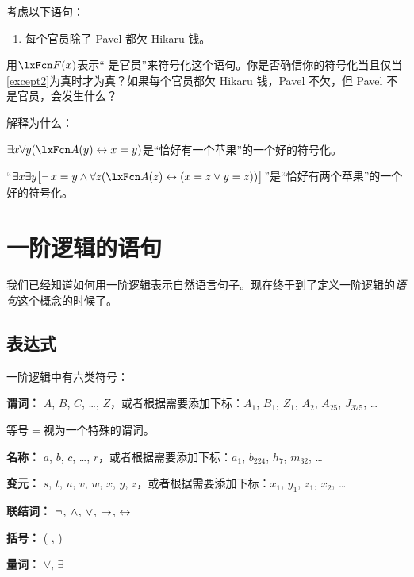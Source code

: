 \problempart
考虑以下语句：


\begin{enumerate}
	\item\label{except2} 每个官员除了 Pavel 都欠 Hikaru 钱。
\end{enumerate}


用$\atom{F}{x}$表示“ 是官员”来符号化这个语句。你是否确信你的符号化当且仅当\cref*{except2}为真时才为真？如果每个官员都欠 Hikaru 钱，Pavel 不欠，但 Pavel 不是官员，会发生什么？

\problempart
解释为什么：


\begin{compactlist}
		\item$\exists x \forall y(\atom{A}{y} \eiff x= y)$是“恰好有一个苹果”的一个好的符号化。
		\item“$\exists x \exists y \bigl[\enot\, {x = y} \eand \forall
		z(\atom{A}{z} \eiff (x= z \eor y = z))\bigr]$”是“恰好有两个苹果”的一个好的符号化。
	\end{compactlist}

\chapter{一阶逻辑的语句}\label{s:FOLSentences}
我们已经知道如何用一阶逻辑表示自然语言句子。现在终于到了定义一阶逻辑的\emph{语句}这个概念的时候了。

\section{表达式}
一阶逻辑中有六类符号：

\begin{compactlist}
\item \textbf{谓词：} $A$, $B$, $C$, \dots, $Z$，或者根据需要添加下标：$A_1$, $B_1$, $Z_1$, $A_2$, $A_{25}$, $J_{375}$, \dots

等号$=$视为一个特殊的谓词。
\item \textbf{名称：} $a$, $b$, $c$, \dots, $r$，或者根据需要添加下标：$a_1$, $b_{224}$, $h_7$, $m_{32}$, \dots
\item \textbf{变元：} $s$, $t$, $u$, $v$, $w$, $x$, $y$, $z$，或者根据需要添加下标：$x_1$, $y_1$, $z_1$, $x_2$, \dots
\item \textbf{联结词：}  $\neg$, $\wedge$, $\vee$, $\rightarrow$, $\leftrightarrow$
\item \textbf{括号：} ( , )
\item \textbf{量词：}  $\forall$, $\exists$
\end{compactlist}


